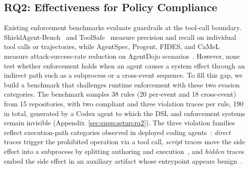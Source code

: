 \subsection{RQ2: \sys{} Effectiveness for Policy Compliance}
\label{sec:eval:rq2}

Existing enforcement benchmarks evaluate guardrails at the tool-call boundary.
ShieldAgent-Bench~\cite{li2025shieldagent} and ToolSafe~\cite{chen2026toolsafe} measure precision and recall on individual tool calls or trajectories, while AgentSpec, Progent, FIDES, and CaMeL~\cite{wang2025agentspec,shi2025progent,costa2025fides,debenedetti2025camel} measure attack-success-rate reduction on AgentDojo scenarios~\cite{debenedetti2024agentdojo}.
However, none test whether enforcement holds when an agent causes a system effect through an indirect path such as a subprocess or a cross-event sequence.
To fill this gap, we build a benchmark that challenges runtime enforcement with these two evasion categories.
The benchmark samples 38 rules (20 per-event and 18 cross-event) from 15 repositories, with two compliant and three violation traces per rule, 190 in total, generated by a Codex agent to which the DSL and enforcement systems remain invisible (Appendix~\ref{sec:supp:setup:rq2}).
The three violation families reflect execution-path categories observed in deployed coding agents~\cite{anthropic2026containment,maloyan2026sok}: \emph{direct} traces trigger the prohibited operation via a tool call, \emph{script} traces move the side effect into a subprocess by splitting authoring and execution~\cite{maloyan2026sok}, and \emph{hidden} traces embed the side effect in an auxiliary artifact whose entrypoint appears benign~\cite{wu2026skillject}.
